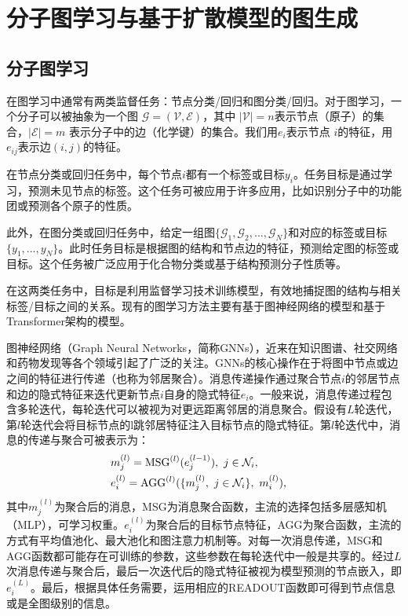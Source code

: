 \chapter[分子图学习与基于扩散模型的图生成]{分子图学习与基于扩散模型的图生成}
\label{chap:diffusion-based_molgen}

\section{分子图学习}
在图学习中通常有两类监督任务：节点分类/回归和图分类/回归。对于图学习，一个分子可以被抽象为一个图 $\mathcal{G} = (\mathcal{V}, \mathcal{E})$，其中 $|\mathcal{V}| = n$表示节点（原子）的集合，$|\mathcal{E}| = m$ 表示分子中的边（化学键）的集合。我们用$e_i$表示节点 $i$的特征，用$e_{ij}$表示边$(i, j)$的特征。

在节点分类或回归任务中，每个节点$i$都有一个标签或目标$y_i$。任务目标是通过学习，预测未见节点的标签。这个任务可被应用于许多应用，比如识别分子中的功能团或预测各个原子的性质。

此外，在图分类或回归任务中，给定一组图$\{ \mathcal{G}_1, \mathcal{G}_2, ..., \mathcal{G}_N \}$和对应的标签或目标 $\{ y_1, ..., y_N \}$。此时任务目标是根据图的结构和节点边的特征，预测给定图的标签或目标。这个任务被广泛应用于化合物分类或基于结构预测分子性质等。

在这两类任务中，目标是利用监督学习技术训练模型，有效地捕捉图的结构与相关标签/目标之间的关系。现有的图学习方法主要有基于图神经网络的模型和基于Transformer架构的模型。

图神经网络（Graph Neural Networks，简称GNNs），近来在知识图谱、社交网络和药物发现等各个领域引起了广泛的关注。GNNs的核心操作在于将图中节点或边之间的特征进行传递（也称为邻居聚合）。消息传递操作通过聚合节点$i$的邻居节点和边的隐式特征来迭代更新节点$i$自身的隐式特征$e_i$。一般来说，消息传递过程包含多轮迭代，每轮迭代可以被视为对更远距离邻居的消息聚合。假设有$L$轮迭代，第$l$轮迭代会将目标节点的l跳邻居特征注入目标节点的隐式特征。第$l$轮迭代中，消息的传递与聚合可被表示为：
\begin{eqnarray}
    &m_j^{(l)} = {\rm MSG}^{(l)}(e_j^{(l-1)}), \ j \in \mathcal{N}_i, & \\
    &e_i^{(l)} = {\rm AGG}^{(l)}(\{ m_j^{(l)}, \ j \in \mathcal{N}_i \}, \ m_i^{(l)} ), &
\end{eqnarray}
其中$m_j^{(l)}$为聚合后的消息，MSG为消息聚合函数，主流的选择包括多层感知机（MLP），可学习权重。$e_i^{(l)}$为聚合后的目标节点特征，AGG为聚合函数，主流的方式有平均值池化、最大池化和图注意力机制等。对每一次消息传递，MSG和AGG函数都可能存在可训练的参数，这些参数在每轮迭代中一般是共享的。经过$L$次消息传递与聚合后，最后一次迭代后的隐式特征被视为模型预测的节点嵌入，即$e_i^{(L)}$。最后，根据具体任务需要，运用相应的READOUT函数即可得到节点信息或是全图级别的信息。

